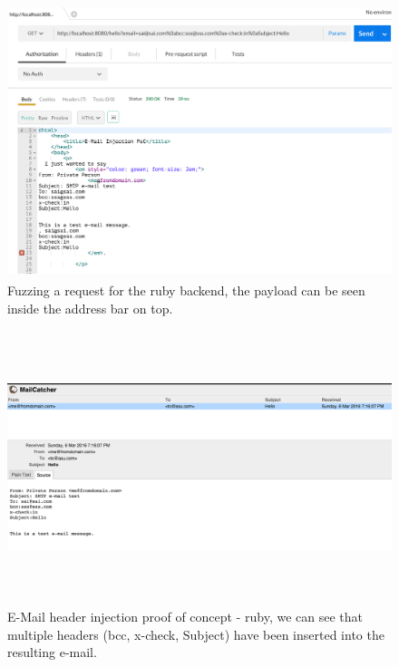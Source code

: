 \begin{figure}[!htbp]
	\centering
	\includegraphics[width=14cm, height=8cm]{System/EMI_Postman_Ruby}
	\caption[Fuzzing a request for the ruby backend]{Fuzzing a request for the ruby backend, the payload can be seen inside the address bar on top.}
	\label{fig:postmanruby}
\end{figure}

\begin{figure}[!htbp]
	\centering
	\includegraphics[width=14cm, height=8cm]{System/EMI_Mailcatcher_Ruby}
	\caption[E-Mail header injection proof of concept - ruby]{E-Mail header injection proof of concept - ruby, we can see that multiple headers (bcc, x-check, Subject) have been inserted into the resulting e-mail.}
	\label{fig:mailcatcherruby}
\end{figure}

